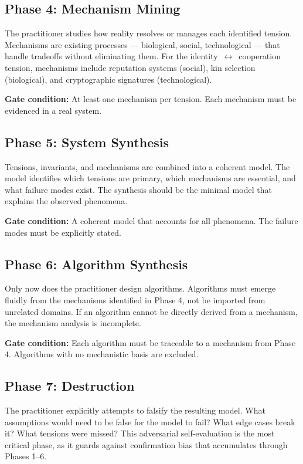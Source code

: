 \documentclass[11pt,a4paper]{article}
\begin{document}
\subsection{Phase 4: Mechanism Mining}

The practitioner studies how reality resolves or manages each identified tension. Mechanisms are existing processes --- biological, social, technological --- that handle tradeoffs without eliminating them. For the identity~$\leftrightarrow$~cooperation tension, mechanisms include reputation systems (social), kin selection (biological), and cryptographic signatures (technological).

\textbf{Gate condition:} At least one mechanism per tension. Each mechanism must be evidenced in a real system.

\subsection{Phase 5: System Synthesis}

Tensions, invariants, and mechanisms are combined into a coherent model. The model identifies which tensions are primary, which mechanisms are essential, and what failure modes exist. The synthesis should be the minimal model that explains the observed phenomena.

\textbf{Gate condition:} A coherent model that accounts for all phenomena. The failure modes must be explicitly stated.

\subsection{Phase 6: Algorithm Synthesis}

Only now does the practitioner design algorithms. Algorithms must emerge fluidly from the mechanisms identified in Phase 4, not be imported from unrelated domains. If an algorithm cannot be directly derived from a mechanism, the mechanism analysis is incomplete.

\textbf{Gate condition:} Each algorithm must be traceable to a mechanism from Phase 4. Algorithms with no mechanistic basis are excluded.

\subsection{Phase 7: Destruction}

The practitioner explicitly attempts to falsify the resulting model. What assumptions would need to be false for the model to fail? What edge cases break it? What tensions were missed? This adversarial self-evaluation is the most critical phase, as it guards against confirmation bias that accumulates through Phases 1--6.
\end{document}
